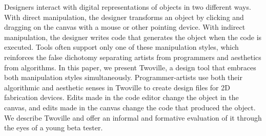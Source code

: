 Designers interact with digital representations of objects in two different ways. With direct manipulation, the designer transforms an object by clicking and dragging on the canvas with a mouse or other pointing device. With indirect manipulation, the designer writes code that generates the object when the code is executed. Tools often support only one of these manipulation styles, which reinforces the false dichotomy separating artists from programmers and aesthetics from algorithms. In this paper, we present Twoville, a design tool that embraces both manipulation styles simultaneously. Programmer-artists use both their algorithmic and aesthetic senses in Twoville to create design files for 2D fabrication devices. Edits made in the code editor change the object in the canvas, and edits made in the canvas change the code that produced the object. We describe Twoville and offer an informal and formative evaluation of it through the eyes of a young beta tester.
